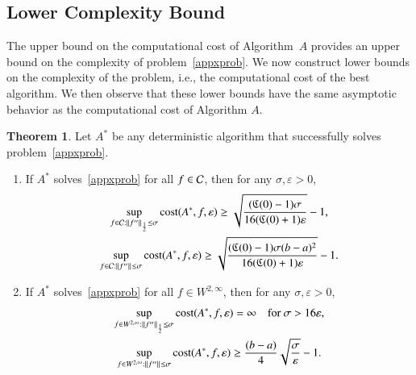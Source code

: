 \documentclass[review]{elsarticle}
\newcommand{\abstol}{\varepsilon}
\theoremstyle{definition}
\renewcommand{\cw}{W}
\newtheorem{theorem}{Theorem}
\begin{document}
\subsection{Lower Complexity Bound} \label{subsec:appxcomp}

The upper bound on the computational cost of Algorithm~$A$ provides an upper bound on the complexity of problem~\eqref{appxprob}.  We now construct lower bounds on the complexity of the problem, i.e., the computational cost of the best algorithm.  We then observe that these lower bounds have the same asymptotic behavior as the computational cost of Algorithm $A$.

\begin{theorem}
	Let $A^*$ be any deterministic algorithm that successfully solves problem~\eqref{appxprob}.
	
	\begin{enumerate}
		\renewcommand{\labelenumi}{\roman{enumi}.}
		\item  If $A^*$ solves~\eqref{appxprob} for all $f \in \mathcal{C}$, then for any $\sigma, \abstol >0$,
		\begin{subequations} \label{lowbdC}
		\begin{gather}
		\sup_{f \in \cc : \norm[\frac12]{f''} \le\sigma } \cost(A^*,f,\abstol) \ge \sqrt{\frac{(\fC(0)-1)\sigma}{16(\fC(0)+1)\abstol}} -1, \label{lowbdChalf}\\
		\sup_{f \in \cc : \norm{f''} \le\sigma } \cost(A^*,f,\abstol) \ge \sqrt{\frac{(\fC(0)-1)\sigma(b-a)^2}{16(\fC(0)+1)\abstol}} -1 \label{lowbdCinf}.
		\end{gather}
		\end{subequations}
		
		\item If $A^*$ solves~\eqref{appxprob} for all $f \in  \cw^{2,\infty}$, then for any $\sigma, \abstol >0$,
		\begin{subequations} \label{lowbdW}
		\begin{gather}
		\sup_{f \in \cw^{2,\infty} : \norm[\frac12]{f''} \le \sigma} \cost(A^*,f,\abstol) = \infty \quad \text{for } \sigma > 16 \abstol, \label{lowbdWhalf}\\
		\sup_{f \in \cw^{2,\infty} : \norm{f''} \le\sigma } \cost(A^*,f,\abstol) \ge \frac{(b-a)}{4} \sqrt{\frac{\sigma}{\abstol}} - 1.  \label{lowbdWinf}
		\end{gather}
		\end{subequations}
				
	\end{enumerate}
	\label{thm:A_cost}
\end{theorem}
\end{document}
